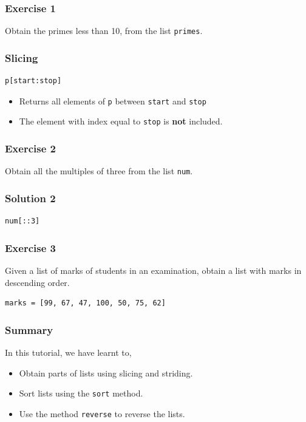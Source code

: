 \documentclass[17pt]{beamer}
\begin{document}
\begin{frame}
\frametitle{Exercise 1}
\label{sec-4}

  Obtain the primes less than 10, from the list  \texttt{primes}. 
\end{frame}

\begin{frame}[fragile]
\frametitle{Slicing}
\label{sec-5}

\lstset{language=Python}
\begin{lstlisting}
p[start:stop]
\end{lstlisting}

\begin{itemize}
\item Returns all elements of \texttt{p} between \texttt{start} and \texttt{stop}
\item The element with index equal to \texttt{stop} is \textbf{not} included.
\end{itemize}
\end{frame}

\begin{frame}
\frametitle{Exercise 2}
\label{sec-6}

  Obtain all the multiples of three from the list \texttt{num}.
\end{frame}

\begin{frame}[fragile]
\frametitle{Solution 2}
\label{sec-7}

\lstset{language=Python}
\begin{lstlisting}
num[::3]
\end{lstlisting}
\end{frame}

\begin{frame}[fragile]
\frametitle{Exercise 3}
\label{sec-8}

  Given a list of marks of students in an examination, obtain a list
  with marks in descending order.
\lstset{language=Python}
\begin{small}
\begin{lstlisting}
marks = [99, 67, 47, 100, 50, 75, 62]
\end{lstlisting}
\end{small}
\end{frame}

\begin{frame}
\frametitle{Summary}
\label{sec-9}

  In this tutorial, we have learnt to,


\begin{itemize}
\item Obtain parts of lists using slicing and striding.\pause
\item Sort lists using the \texttt{sort} method.\pause
\item Use the method \texttt{reverse} to reverse the lists.
\end{itemize}
\end{frame}
\end{document}
